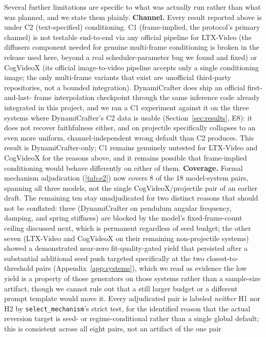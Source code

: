 Several further limitations are specific to what was actually run rather than
what was planned, and we state them plainly. \textbf{Channel.} Every result
reported above is under C2 (text-specified) conditioning. C1 (frame-implied,
the protocol's primary channel) is not testable end-to-end via any official
pipeline for LTX-Video (the diffusers component needed for genuine
multi-frame conditioning is broken in the release used here, beyond a real
scheduler-parameter bug we found and fixed) or CogVideoX (its official
image-to-video pipeline accepts only a single conditioning image; the only
multi-frame variants that exist are unofficial third-party repositories, not
a bounded integration). DynamiCrafter does ship an official first-and-last-
frame interpolation checkpoint through the same inference code already
integrated in this project, and we ran a C1 experiment against it on the
three systems where DynamiCrafter's C2 data is usable
(Section~\ref{sec:results}, E8): it does not recover faithfulness either,
and on projectile specifically collapses to an even more uniform,
channel-independent wrong default than C2 produces. This result is
DynamiCrafter-only; C1 remains genuinely untested for LTX-Video and
CogVideoX for the reasons above, and it remains possible that
frame-implied conditioning would behave differently on either of them.
\textbf{Coverage.}
Formal mechanism adjudication (\autoref{tab:e2}) now covers 8 of the 18
model-system pairs, spanning all three models, not the single
CogVideoX/projectile pair of an earlier draft. The remaining ten stay
unadjudicated for two distinct reasons that should not be conflated: three
(DynamiCrafter on pendulum angular frequency, damping, and spring stiffness)
are blocked by the model's fixed-frame-count ceiling discussed next, which
is permanent regardless of seed budget; the other seven (LTX-Video and
CogVideoX on their remaining non-projectile systems) showed a demonstrated
near-zero fit-quality-gated yield that persisted after a substantial
additional seed push targeted specifically at the two closest-to-threshold
pairs (Appendix~\ref{app:systems}), which we read as evidence the low yield
is a property of those generators on those systems rather than a
sample-size artifact, though we cannot rule out that a still larger budget
or a different prompt template would move it. Every adjudicated pair is
labeled \emph{neither} H1 nor H2 by \texttt{select\_mechanism}'s strict
test, for the identified reason that the actual reversion target is seed-
or regime-conditional rather than a single global default; this is
consistent across all eight pairs, not an artifact of the one pair
